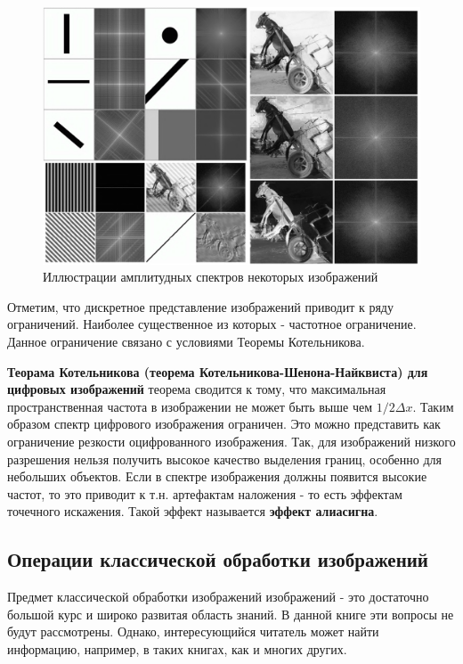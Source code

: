 \documentclass[12pt]{article}
\begin{document}
\begin{sloppypar}
    \begin{figure}[!h]
    	\begin{center}
    		\includegraphics[width=0.99\linewidth]{./figuresch2/spectrum.png}
    		\caption{Иллюстрации амплитудных спектров некоторых изображений}		
    		\label{ch2:fig:spectrum}
    	\end{center}
    \end{figure}
Отметим, что дискретное представление изображений приводит к ряду ограничений.  Наиболее существенное из которых - частотное ограничение. Данное ограничение связано с условиями Теоремы Котельникова. 

\textbf{Теорама Котельникова (теорема Котельникова-Шенона-Найквиста) для цифровых изображений}  теорема сводится к тому, что максимальная пространственная частота в изображении не может быть выше чем $1/2\Delta x$. Таким образом спектр цифрового изображения ограничен. Это можно представить как ограничение резкости оцифрованного изображения. Так, для изображений низкого разрешения нельзя получить высокое качество выделения границ, особенно для небольших объектов.  Если в спектре изображения должны появится высокие частот, то это приводит к т.н. артефактам наложения - то есть эффектам точечного искажения. Такой эффект называется\textbf{ эффект алиасигна}.

 \subsection{Операции классической обработки изображений}
Предмет классической обработки изображений изображений - это достаточно большой курс и широко развитая область знаний. В данной книге эти вопросы не будут рассмотрены. Однако, интересующийся читатель может найти информацию, например, в таких книгах, как
\cite{Gonsales2019Digital, Jane2011Digital, solomon2011fundamentals} и многих других.


\end{sloppypar}
\end{document}
